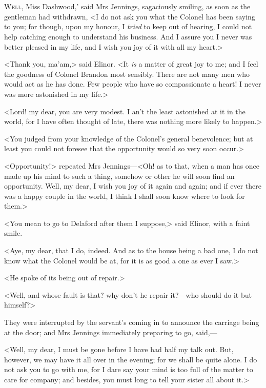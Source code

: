 \chapter[Chapter \thechapter]{}
\lettrine[ante=`,lraise=0.3]{W}{ell,} Miss Dashwood,' said Mrs Jennings, sagaciously smiling, as soon as the gentleman had withdrawn, <I do not ask you what the Colonel has been saying to you; for though, upon my honour, I \textit{tried} to keep out of hearing, I could not help catching enough to understand his business. And I assure you I never was better pleased in my life, and I wish you joy of it with all my heart.>

<Thank you, ma'am,> said Elinor. <It \textit{is} a matter of great joy to me; and I feel the goodness of Colonel Brandon most sensibly. There are not many men who would act as he has done. Few people who have so compassionate a heart! I never was more astonished in my life.>

<Lord! my dear, you are very modest. I an't the least astonished at it in the world, for I have often thought of late, there was nothing more likely to happen.>

<You judged from your knowledge of the Colonel's general benevolence; but at least you could not foresee that the opportunity would so very soon occur.>

<Opportunity!> repeated Mrs Jennings—<Oh! as to that, when a man has once made up his mind to such a thing, somehow or other he will soon find an opportunity. Well, my dear, I wish you joy of it again and again; and if ever there was a happy couple in the world, I think I shall soon know where to look for them.>

<You mean to go to Delaford after them I suppose,> said Elinor, with a faint smile.

<Aye, my dear, that I do, indeed. And as to the house being a bad one, I do not know what the Colonel would be at, for it is as good a one as ever I saw.>

<He spoke of its being out of repair.>

<Well, and whose fault is that? why don't he repair it?—who should do it but himself?>

They were interrupted by the servant's coming in to announce the carriage being at the door; and Mrs Jennings immediately preparing to go, said,—

<Well, my dear, I must be gone before I have had half my talk out. But, however, we may have it all over in the evening; for we shall be quite alone. I do not ask you to go with me, for I dare say your mind is too full of the matter to care for company; and besides, you must long to tell your sister all about it.>


